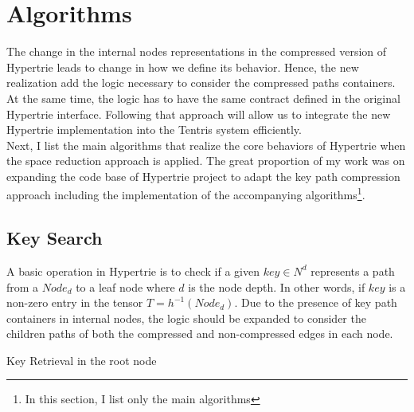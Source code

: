 \section{Algorithms}
The change in the internal nodes representations in the compressed version of Hypertrie leads to change in how we define its behavior. 
Hence, the new realization add the logic necessary to consider the compressed paths containers. 
At the same time, the logic has to have the same contract defined in the original Hypertrie interface. 
Following that approach will allow us to integrate the new Hypertrie implementation into the Tentris system efficiently. \\

Next, I list the main algorithms that realize the core behaviors of Hypertrie when the space reduction approach is applied. The great proportion of my work was on expanding the code base of Hypertrie project to adapt the key path compression approach including the implementation of the accompanying algorithms\footnote{In this section, I list only the main algorithms}.

\subsection{Key Search}
A basic operation in Hypertrie is to check if a given $key \in N^d$ represents a path from a $Node_{d}$ to a leaf node where $d$ is the node depth. In other words, if $key$ is a non-zero entry in the tensor $T = h^{-1} (Node_{d})$. Due to the presence of key path containers in internal nodes, the logic should be expanded to consider the children paths of both the compressed and non-compressed edges in each node. \\

\begin{algorithm}
	\DontPrintSemicolon
	\SetAlgoLined
     \;
\caption{\sc Key Retrieval in the root node}
\label{algo:key_retrieval_depth3}

\end{algorithm}


